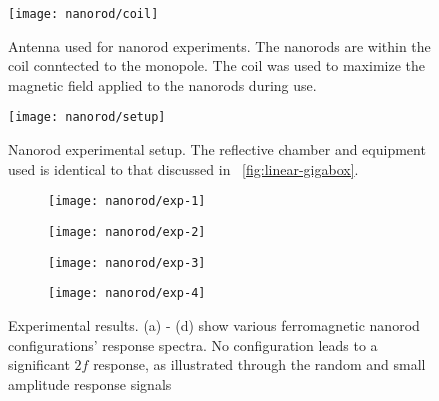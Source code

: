 \begin{figure}[t]
    \centering
    \begin{minipage}[b]{.4\textwidth}
        \centering
        \texttt{[image: nanorod/coil]}
        \caption[Nanorods attached to antenna]{Antenna used for nanorod experiments. The nanorods are within the coil conntected to the monopole. The coil was used to maximize the magnetic field applied to the nanorods during use.}
        \label{fig:nltr-nanorod-coil}
    \end{minipage}
    \hfill
    \begin{minipage}[b]{.4\textwidth}
        \centering
        \texttt{[image: nanorod/setup]}
        \caption[Nanorod experimental setup]{Nanorod experimental setup. The reflective chamber and equipment used is identical to that discussed in ~\ref{fig:linear-gigabox}.}
        \label{fig:nltr-nanorod-setup}
    \end{minipage}
\end{figure}


 \begin{figure}
     \centering
     \begin{subfigure}{0.45\textwidth}
         \centering
         \texttt{[image: nanorod/exp-1]}
         \caption[]{}
         \label{fig:nanorod-exp-1}
     \end{subfigure}
         \begin{subfigure}{0.45\textwidth}
         \centering
         \texttt{[image: nanorod/exp-2]}
         \caption[]{}
         \label{fig:nanorod-exp-2}
     \end{subfigure}
         \begin{subfigure}{0.45\textwidth}
         \centering
         \texttt{[image: nanorod/exp-3]}
         \caption[]{}
         \label{fig:nanorod-exp-3}
     \end{subfigure}
         \begin{subfigure}{0.45\textwidth}
         \centering
         \texttt{[image: nanorod/exp-4]}
         \caption[]{}
         \label{fig:nanorod-exp-4}
     \end{subfigure}
     \caption[Ferromagnetic nanorod experimental results]{Experimental results. (a) - (d) show various ferromagnetic nanorod configurations' response spectra. No configuration leads to a significant $2f$ response, as illustrated through the random and small amplitude response signals}
     \label{fig:nanorod-results}
 \end{figure}

